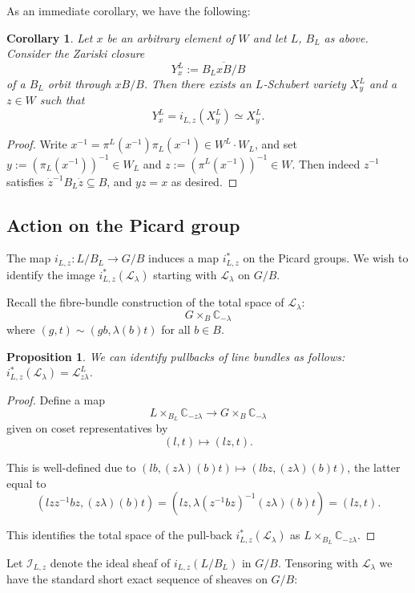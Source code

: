 \documentclass[12pt,reqno]{amsart}
\newcommand{\C}{\mathbb{C}}
\newtheorem{corollary}[theorem]{Corollary}
\newtheorem{proposition}[theorem]{Proposition}
\theoremstyle{definition}
\begin{document}
As an immediate corollary, we have the following:

\begin{corollary}
	Let $x$ be an arbitrary element of $W$ and let $L$, $B_L$ as above. Consider the Zariski closure \[Y^L_x:=\overline{B_L x B/B}\] of a $B_L$ orbit through $xB/B$. Then there exists an $L$-Schubert variety $X_{y}^L$ and a $z \in W$ such that \[Y^L_x= i_{L,z}(X^L_{y}) \simeq X^L_{y}.\]
\end{corollary}

\begin{proof}
Write $x^{-1}=\pi^L(x^{-1})\pi_L(x^{-1}) \in W^L \cdot W_L$, and set $y:=(\pi_L(x^{-1}))^{-1} \in W_L$ and $z:=(\pi^L(x^{-1}))^{-1}\in W$. Then indeed $z^{-1}$ satisfies $\dot{z}^{-1}B_L \dot{z} \subseteq B$, and $yz=x$ as desired. 
\end{proof} 

\subsection{Action on the Picard group}

The map $i_{L,z}: L/B_L \to G/B$ induces a map $i_{L,z}^*$ on the Picard groups. We wish to identify the image $i_{L,z}^*(\mathscr{L}_\lambda)$ starting with $\mathscr{L}_\lambda$ on $G/B$. 

Recall the fibre-bundle construction of the total space of $\mathscr{L}_\lambda$: 
$$G \times_B \C_{-\lambda} $$
where 
$(g,t) \sim (gb, \lambda(b) t)$ for all $b\in B$. 

\begin{proposition} \label{pullback}
We can identify pullbacks of line bundles as follows:
$i_{L,z}^*(\mathscr{L}_\lambda) = \mathscr{L}_{z\lambda}^L$. 
\end{proposition}

\begin{proof}
Define a map 
$$ L \times_{B_L} \C_{-z\lambda} \to G \times_B \C_{-\lambda}$$
given on coset representatives by 
$$
(l, t) \mapsto (lz, t).
$$

This is well-defined due to
$
(lb, (z\lambda)(b) t) \mapsto (lbz, (z\lambda)(b) t)$, the latter equal to $$ (lz z^{-1}bz, (z\lambda)(b) t) = (lz, \lambda(z^{-1} b z)^{-1} (z\lambda)(b) t ) = (lz, t).
$$

This identifies the total space of the pull-back $i_{L,z}^*(\mathscr{L}_\lambda)$ as $L \times_{B_L} \C_{-z\lambda} $. 
\end{proof}

Let $\mathscr{I}_{L,z}$ denote the ideal sheaf of $i_{L,z}(L/B_L)$ in $G/B$. Tensoring with $\mathscr{L}_{\lambda}$ we have the standard short exact sequence of sheaves on $G/B$:
\end{document}
